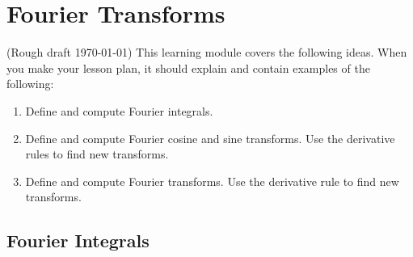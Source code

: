 
\chapter{Fourier Transforms}

\noindent(Rough draft \today) This learning module covers the following ideas.  When you make your lesson plan, it should explain and contain examples of the following:
\begin{enumerate}

\item Define and compute Fourier integrals. 
\item Define and compute Fourier cosine and sine transforms.   Use the derivative rules to find new transforms.
\item Define and compute Fourier transforms.   Use the derivative rule to find new transforms.

\end{enumerate}


\section{Fourier Integrals}

